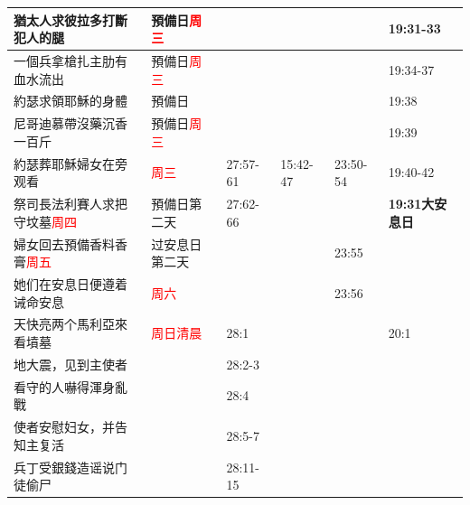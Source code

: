 \begin{table}[H]
\begin{tabular}{p{14em}|p{7.93em}|l|l|l|p{4.855em}}
猶太人求彼拉多打斷犯人的腿&預備日\textcolor{red}{周三} && &&19:31-33\\\midrule
一個兵拿槍扎主肋有血水流出&預備日\textcolor{red}{周三}&& &&19:34-37\\\midrule

約瑟求領耶穌的身體&預備日 && &&19:38\\\midrule
尼哥迪慕帶沒藥沉香一百斤&預備日\textcolor{red}{周三}&& &&19:39\\\midrule


約瑟葬耶穌婦女在旁观看&\textcolor{red}{周三}&27:57-61 &  15:42-47&23:50-54&19:40-42\\\midrule

祭司長法利賽人求把守坟墓\textcolor{red}{周四}&預備日第二天&27:62-66&&&\multicolumn{1}{p{6.85em}}{\textbf{19:31大安息日}}  \\\midrule
婦女回去預備香料香膏\textcolor{red}{周五}&过安息日第二天     &&       &23:55&  \\\midrule

她们在安息日便遵着诫命安息&\textcolor{red}{周六}&&       &23:56&  \\\midrule
天快亮两个馬利亞來看墳墓&\textcolor{red}{周日清晨}&28:1&       &&20:1 \\\midrule
地大震，见到主使者&       &28:2-3&       &&  \\\midrule
看守的人嚇得渾身亂戰&       &28:4&       &&  \\\midrule
使者安慰妇女，并告知主复活&       &28:5-7&       &&  \\\midrule
兵丁受銀錢造谣说门徒偷尸&       &28:11-15 &       &&  \\\midrule



\end{tabular}%
\end{table}


